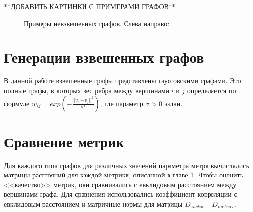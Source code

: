**ДОБАВИТЬ КАРТИНКИ С ПРИМЕРАМИ ГРАФОВ**
\begin{figure}[h]
  \begin{minipage}[h]{0.29\linewidth}
  \end{minipage}
  \hfill
  \begin{minipage}[h]{0.29\linewidth}
  \end{minipage}
  \hfill
  \begin{minipage}[h]{0.29\linewidth}
  \end{minipage}
  \caption{Примеры невзвешенных графов. Слева направо: }
  \label{img:knuth}  
\end{figure}


\section{Генерации взвешенных графов} \label{sect2_3}

В данной работе взвешенные графы представлены гауссовскими графами. Это полные графы, в которых вес ребра между вершинами $i$ и $j$ определяется по формуле $w_{ij} = exp(-\frac{||v_i - v_j||^2} {\sigma^2} )$, где параметр $\sigma > 0$ задан.


\section{Сравнение метрик} \label{sect2_4}

Для каждого типа графов для различных значений параметра метрк вычислялись матрицы расстояний для каждой метрики, описанной в главе 1. Чтобы оценить <<качество>> метрик, они сравнивались с евклидовым расстоянием между вершинами графа. Для сравнения использовались коэффициент корреляции с евклидовым расстоянием и матричные нормы для матрицы $D_{euclid} - D_{metrics}$.



